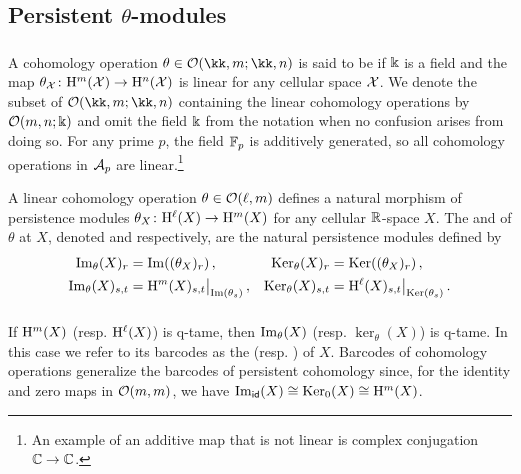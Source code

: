 
\subsection{Persistent $\theta$-modules}

\subsubsection{}

A cohomology operation $\theta \in \cO(\kk,m; \kk,n)$ is said to be  if $\Bbbk$ is a field and the map $\theta_{\mathcal{X}} \colon \mathrm{H}^m(\mathcal{X}) \to \mathrm{H}^n(\mathcal{X})$ is linear for any cellular space $\mathcal{X}$.
We denote the subset of $\cO(\kk,m; \kk,n)$ containing the linear cohomology operations by $\mathcal{O}(m,n;\Bbbk)$ and omit the field \(\Bbbk\) from the notation when no confusion arises from doing so.
For any prime $p$, the field ${\mathbb{F}_p}$ is additively generated, so all cohomology operations in $\mathcal{A}_p$ are linear.\footnote{An example of an additive map that is not linear is complex conjugation $\mathbb{C} \to \mathbb{C}$.}

A linear cohomology operation \(\theta \in \mathcal{O}(\ell,m)\) defines a natural morphism of persistence modules $\theta_X \colon \mathrm{H}^\ell(X) \to \mathrm{H}^m(X)$ for any cellular $\mathbb{R}$-space $X$.
The  and  of $\theta$ at \(X\), denoted  and  respectively, are the natural persistence modules defined by
\begin{align*}
	\operatorname{Im}_\theta(X)_r &= \operatorname{Im}((\theta_X)_r)\,, &
	\operatorname{Ker}_\theta(X)_r &= \operatorname{Ker}((\theta_X)_r)\,, \\
	\operatorname{Im}_\theta(X)_{s,t} &= \mathrm{H}^m(X)_{s,t}\big|_{\operatorname{Im}(\theta_s)}\,, &
	\operatorname{Ker}_\theta(X)_{s,t} &= \mathrm{H}^\ell(X)_{s,t}\big|_{\operatorname{Ker}(\theta_s)}\,.
\end{align*}

\subsubsection{}

If $\mathrm{H}^m(X)$ (resp. \(\mathrm{H}^\ell(X)\)) is q-tame, then $\operatorname{Im}_\theta(X)$ (resp. $\ker_\theta(X)$) is q-tame.
In this case we refer to its barcodes as the  (resp. ) of \(X\).
Barcodes of cohomology operations generalize the barcodes of persistent cohomology since, for the identity and zero maps in $\mathcal{O}(m,m)$, we have $\operatorname{Im}_{\mathsf{id}}(X) \cong \operatorname{Ker}_0(X) \cong \mathrm{H}^m(X)$.

